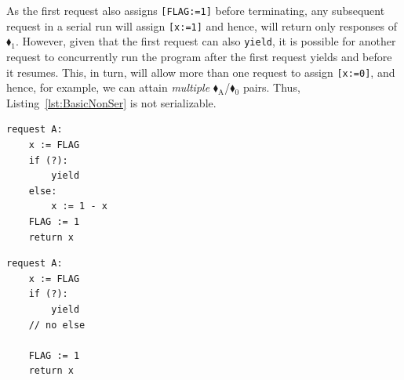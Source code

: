 %
As the first request also assigns \texttt{[FLAG:=1]} before terminating, any subsequent request in a serial run will assign \texttt{[x:=1]} and hence, will return only responses of {\color{red}$\blacklozenge_1$}. 
%
%
%
%
%
%
%
%
However, given that the first request can also \texttt{yield}, it is possible for another request to concurrently run the program after the first request yields and before it resumes. This, in turn, will allow more than one request to assign \texttt{[x:=0]}, and hence, for example, we can attain \textit{multiple} {\color{ForestGreen}$\blacklozenge_\text{A}$}/{\color{red}$\blacklozenge_0$} pairs. Thus, Listing~\ref{lst:BasicNonSer} is not serializable.
%
%
%
%
%




\noindent
\begin{minipage}[t]{0.45\textwidth}
	\begin{lstlisting}[caption={Serializable},
		label={lst:BasicSer},numbers=none]
request A: 
    x := FLAG
    if (?):
        yield
    else:
        x := 1 - x
    FLAG := 1
    return x
	\end{lstlisting}
\end{minipage}
\hfill
\begin{minipage}[t]{0.45\textwidth}
	\begin{lstlisting}[caption={Not serializable},
	label={lst:BasicNonSer},numbers=none]
request A: 
    x := FLAG 
    if (?): 
        yield
    // no else
	
    FLAG := 1 
    return x
		\end{lstlisting}
\end{minipage}%

